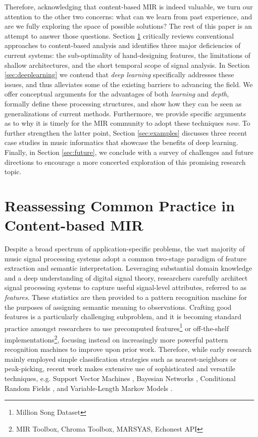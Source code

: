 Therefore, acknowledging that content-based MIR is indeed valuable, we turn our attention to the other two concerns: what can we learn from past experience, and are we fully exploring the space of possible solutions? 
The rest of this paper is an attempt to answer those questions. 
Section \ref{sec:common} critically reviews conventional approaches to content-based analysis and identifies three major deficiencies of current systems: the sub-optimality of hand-designing features, the limitations of shallow architectures, and the short temporal scope of signal analysis. 
In Section \ref{sec:deeplearning} we contend that \emph{deep learning} specifically addresses these issues, and thus alleviates some of the existing barriers to advancing the field. 
We offer conceptual arguments for the advantages of both \emph{learning} and \emph{depth}, formally define these processing structures, and show how they can be seen as generalizations of current methods. 
Furthermore, we provide specific arguments as to why it is timely for the MIR community to adopt these techniques \emph{now}. 
To further strengthen the latter point, Section \ref{sec:examples} discusses three recent case studies in music informatics that showcase the benefits of deep learning. 
Finally, in Section \ref{sec:future}, we conclude with a survey of challenges and future directions to encourage a more concerted exploration of this promising research topic.


\section{Reassessing Common Practice in Content-based MIR}
\label{sec:common}

Despite a broad spectrum of application-specific problems, the vast majority of music signal processing systems adopt a common two-stage paradigm of feature extraction and semantic interpretation.
Leveraging substantial domain knowledge and a deep understanding of digital signal theory, researchers carefully architect signal processing systems to capture useful signal-level attributes, referred to as \emph{features}.
These statistics are then provided to a pattern recognition machine for the purposes of assigning semantic meaning to observations.
Crafting good features is a particularly challenging subproblem, and it is becoming standard practice amongst researchers to use precomputed features\footnote{Million Song Dataset} or off-the-shelf implementations\footnote{MIR Toolbox, Chroma Toolbox, MARSYAS, Echonest API}, focusing instead on increasingly more powerful pattern recognition machines to improve upon prior work. 
Therefore, while early research mainly employed simple classification strategies such as nearest-neighbors or peak-picking, recent work makes extensive use of sophisticated and versatile techniques, e.g. Support Vector Machines \cite{Mandel2005}, Bayesian Networks \cite{Mauch2010a}, Conditional Random Fields \cite{Sumi2012}, and Variable-Length Markov Models \cite{Chordia2011}.

